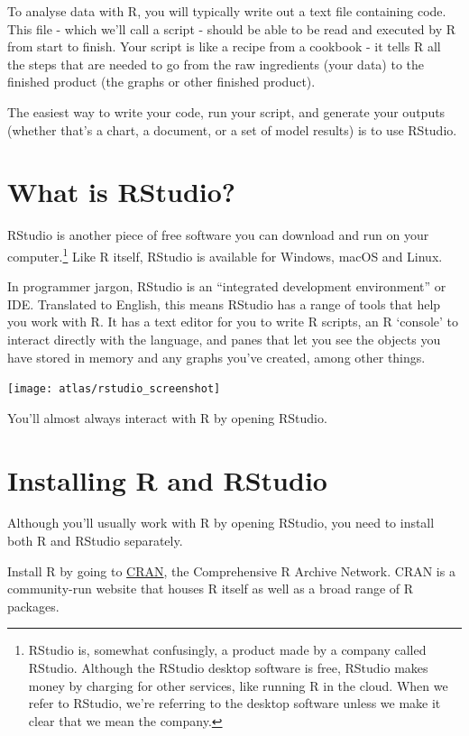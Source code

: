 \documentclass[
]{book}
\begin{document}
To analyse data with R, you will typically write out a text file containing code. This file - which we'll call a script - should be able to be read and executed by R from start to finish. Your script is like a recipe from a cookbook - it tells R all the steps that are needed to go from the raw ingredients (your data) to the finished product (the graphs or other finished product).

The easiest way to write your code, run your script, and generate your outputs (whether that's a chart, a document, or a set of model results) is to use RStudio.

\hypertarget{what-is-rstudio}{%
\section{What is RStudio?}\label{what-is-rstudio}}

RStudio is another piece of free software you can download and run on your computer.\footnote{RStudio is, somewhat confusingly, a product made by a company called RStudio. Although the RStudio desktop software is free, RStudio makes money by charging for other services, like running R in the cloud. When we refer to RStudio, we're referring to the desktop software unless we make it clear that we mean the company.} Like R itself, RStudio is available for Windows, macOS and Linux.

In programmer jargon, RStudio is an ``integrated development environment'' or IDE. Translated to English, this means RStudio has a range of tools that help you work with R. It has a text editor for you to write R scripts, an R `console' to interact directly with the language, and panes that let you see the objects you have stored in memory and any graphs you've created, among other things.

\texttt{[image: atlas/rstudio\_screenshot]}

You'll almost always interact with R by opening RStudio.

\hypertarget{installing-r-and-rstudio}{%
\section{Installing R and RStudio}\label{installing-r-and-rstudio}}

Although you'll usually work with R by opening RStudio, you need to install both R and RStudio separately.

Install R by going to \href{https://cran.r-project.org}{CRAN}, the Comprehensive R Archive Network. CRAN is a community-run website that houses R itself as well as a broad range of R packages.
\end{document}
